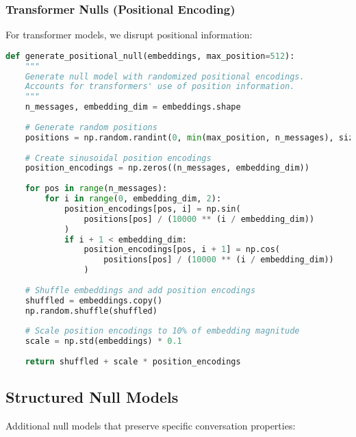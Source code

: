 \documentclass[11pt,letterpaper]{article}
\begin{document}
\subsubsection{Transformer Nulls (Positional Encoding)}

For transformer models, we disrupt positional information:

\begin{lstlisting}[language=Python]
def generate_positional_null(embeddings, max_position=512):
    """
    Generate null model with randomized positional encodings.
    Accounts for transformers' use of position information.
    """
    n_messages, embedding_dim = embeddings.shape
    
    # Generate random positions
    positions = np.random.randint(0, min(max_position, n_messages), size=n_messages)
    
    # Create sinusoidal position encodings
    position_encodings = np.zeros((n_messages, embedding_dim))
    
    for pos in range(n_messages):
        for i in range(0, embedding_dim, 2):
            position_encodings[pos, i] = np.sin(
                positions[pos] / (10000 ** (i / embedding_dim))
            )
            if i + 1 < embedding_dim:
                position_encodings[pos, i + 1] = np.cos(
                    positions[pos] / (10000 ** (i / embedding_dim))
                )
    
    # Shuffle embeddings and add position encodings
    shuffled = embeddings.copy()
    np.random.shuffle(shuffled)
    
    # Scale position encodings to 10% of embedding magnitude
    scale = np.std(embeddings) * 0.1
    
    return shuffled + scale * position_encodings
\end{lstlisting}

\subsection{Structured Null Models}

Additional null models that preserve specific conversation properties:
\end{document}
